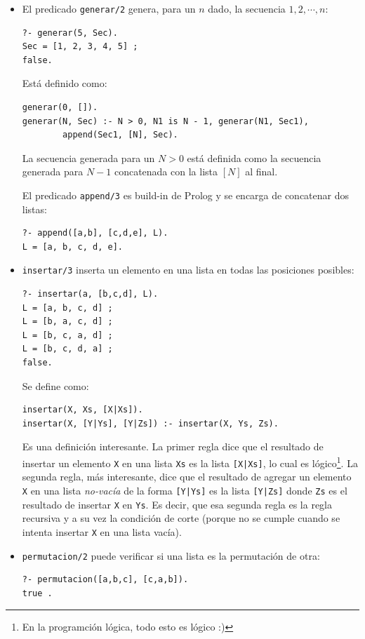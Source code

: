 \documentclass[12pt,titlepage]{article}
\begin{document}
\begin{itemize}
\item El predicado \lstinline|generar/2| genera, para un $n$ dado, la secuencia $1, 2, \cdots , n$: 
\begin{lstlisting}
?- generar(5, Sec).
Sec = [1, 2, 3, 4, 5] ;
false.
\end{lstlisting}

Está definido como:
\begin{lstlisting}
generar(0, []).
generar(N, Sec) :- N > 0, N1 is N - 1, generar(N1, Sec1), 
        append(Sec1, [N], Sec).
\end{lstlisting}

La secuencia generada para un $N > 0$ está definida como la secuencia generada para $N-1$ concatenada con la lista $[N]$ al final.

El predicado \lstinline|append/3| es build-in de Prolog y se encarga de concatenar dos listas:
\begin{lstlisting}
?- append([a,b], [c,d,e], L).
L = [a, b, c, d, e].
\end{lstlisting}

\item \lstinline|insertar/3| inserta un elemento en una lista en todas las posiciones posibles: 
\begin{lstlisting}
?- insertar(a, [b,c,d], L).
L = [a, b, c, d] ;
L = [b, a, c, d] ;
L = [b, c, a, d] ;
L = [b, c, d, a] ;
false.
\end{lstlisting}

Se define como: 
\begin{lstlisting}
insertar(X, Xs, [X|Xs]).
insertar(X, [Y|Ys], [Y|Zs]) :- insertar(X, Ys, Zs).
\end{lstlisting}

Es una definición interesante. La primer regla dice que el resultado de insertar un elemento \lstinline$X$ en una lista \lstinline$Xs$ es la lista \lstinline$[X|Xs]$, lo cual es lógico\footnote{En la programción lógica, todo esto es lógico :)}. La segunda regla, más interesante, dice que el resultado de agregar un elemento \lstinline$X$ en una lista \emph{no-vacía} de la forma \lstinline$[Y|Ys]$ es la lista \lstinline$[Y|Zs]$ donde \lstinline$Zs$ es el resultado de insertar \lstinline$X$ en \lstinline$Ys$. Es decir, que esa segunda regla es la regla recursiva y a su vez la condición de corte (porque no se cumple cuando se intenta insertar \lstinline$X$ en una lista vacía).

\item \lstinline|permutacion/2| puede verificar si una lista es la permutación de otra:
\begin{lstlisting}
?- permutacion([a,b,c], [c,a,b]).
true .
\end{lstlisting}


\end{itemize}
\end{document}
